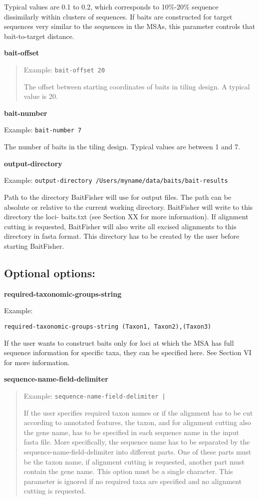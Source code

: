 \documentclass[a4paper,pdflatex,11pt]{article}
\begin{document}
Typical values are 0.1 to 0.2, which corresponds to 10\%-20\% sequence
dissimilarly within clusters of sequences. If baits are constructed for
target sequences very similar to the sequences in the MSAs, this
parameter controls that bait-to-target distance.

\textbf{bait-offset}

\begin{quote}
Example: \verb+bait-offset 20+

The offset between starting coordinates of baits in tiling design. A
typical value is 20.
\end{quote}

\textbf{bait-number}

Example: \verb+bait-number 7+

The number of baits in the tiling design. Typical values are between 1
and 7.

\textbf{output-directory}

Example: \verb+output-directory /Users/myname/data/baits/bait-results+

Path to the directory BaitFisher will use for output files. The path can
be absolute or relative to the current working directory. BaitFisher
will write to this directory the loci- baits.txt (see Section XX for
more information). If alignment cutting is requested, BaitFisher will
also write all excised alignments to this directory in fasta format.
This directory has to be created by the user before starting BaitFisher.

\subsection{Optional options:}

\textbf{required-taxonomic-groups-string}

Example:

\verb+required-taxonomic-groups-string (Taxon1, Taxon2),(Taxon3)+

If the user wants to construct baits only for loci at which the MSA has
full sequence information for specific taxa, they can be specified here.
See Section VI for more information.

\textbf{sequence-name-field-delimiter}

\begin{quote}
Example: \verb+sequence-name-field-delimiter |+

If the user specifies required taxon names or if the alignment has to be
cut according to annotated features, the taxon, and for alignment
cutting also the gene name, has to be specified in each sequence name in
the input fasta file. More specifically, the sequence name has to be
separated by the sequence-name-field-delimiter into different parts.
One of these parts must be the taxon name, if alignment cutting is
requested, another part must contain the gene name. This option must be
a single character. This parameter is ignored if no required taxa are
specified and no alignment cutting is requested.
\end{quote}
\end{document}
